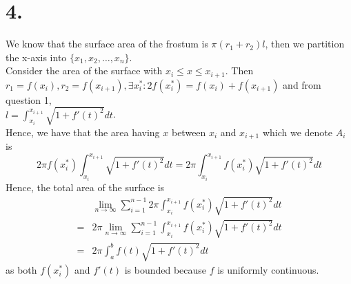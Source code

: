 \documentclass[11pt]{article}
\begin{document}
\section*{4.}
We know that the surface area of the frostum is $\pi (r_1 + r_2) l$, then we partition the x-axis into 
$\{x_1, x_2, \ldots, x_n\}$. \\
Consider the area of the surface with $x_i \le x \le x_{i+1}$. 
Then $r_1 = f(x_i), r_2 = f(x_{i+1}), \exists x_i^*: 2f(x_i^*) = f(x_i) + f(x_{i+1})$ and from question 1, \\
$l = \int_{x_i}^{x_{i+1}} \sqrt{1+f'(t)^2} dt$.\\
Hence, we have that the area having $x$ between $x_i$ and $x_{i+1}$ which we denote $A_i$ is 
\[
    2\pi f(x_i^*) \int_{x_i}^{x_{i+1}} \sqrt{1+f'(t)^2} dt = 2\pi \int_{x_i}^{x_{i+1}} f(x_i^*) \sqrt{1+f'(t)^2} dt 
\]
Hence, the total area of the surface is 
\begin{equation*}
    \begin{aligned}
        &\lim_{n\to \infty} \sum_{i=1}^{n-1} 2\pi \int_{x_i}^{x_{i+1}} f(x_i^*)  \sqrt{1+f'(t)^2} dt \\
        =& 2\pi \lim_{n\to \infty} \sum_{i=1}^{n-1} \int_{x_i}^{x_{i+1}} f(x_i^*)  \sqrt{1+f'(t)^2} dt \\
        =& 2\pi \int_a^b f(t) \sqrt{1+f'(t)^2} dt
    \end{aligned}
\end{equation*}
as both $f(x_i^*)$ and $f'(t)$ is bounded because $f$ is uniformly continuous.
\end{document}
